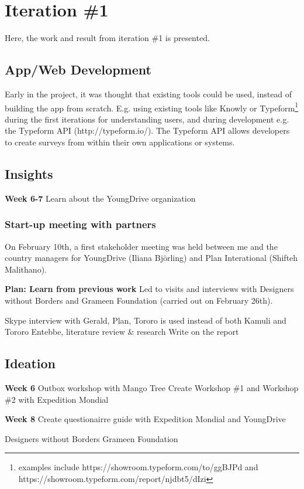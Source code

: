 \section{Iteration \#1}
Here, the work and result from iteration \#1 is presented.

\subsection{App/Web Development}
Early in the project, it was thought that existing tools could be used, instead of building the app from scratch. E.g. using existing tools like Knowly or Typeform\footnote{examples include https://showroom.typeform.com/to/ggBJPd and https://showroom.typeform.com/report/njdbt5/dIzi} during the first iterations for understanding users, and during development e.g. the Typeform API (http://typeform.io/). The Typeform API allows developers to create surveys from within their own applications or systems.

\subsection*{Insights}
\textbf{Week 6-7}
Learn about the YoungDrive organization

\subsubsection{Start-up meeting with partners}
On February 10th, a first stakeholder meeting was held between me and the country managers for YoungDrive (Iliana Björling) and Plan Interational (Shifteh Malithano).

\textbf{Plan: Learn from previous work}
Led to visits and interviews with Designers without Borders and Grameen Foundation (carried out on February 26th).

Skype interview with Gerald, Plan, Tororo is used instead of both Kamuli and Tororo
Entebbe, literature review \& research
Write on the report

\subsection*{Ideation}
\textbf{Week 6}
Outbox workshop with Mango Tree
Create Workshop \#1 and Workshop \#2 with Expedition Mondial

\textbf{Week 8}
Create questionairre guide with Expedition Mondial and YoungDrive

Designers without Borders
Grameen Foundation

